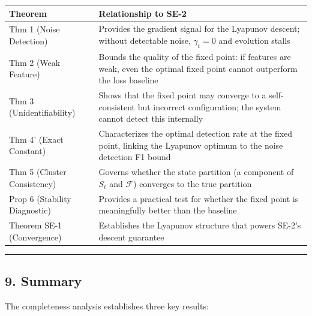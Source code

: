 \documentclass[
  12pt,
]{ctexart}
\begin{document}
\begin{longtable}[]{@{}
  >{\raggedright\arraybackslash}p{}
  >{\raggedright\arraybackslash}p{}@{}}
\toprule\noalign{}
\begin{minipage}[b]{\linewidth}\raggedright
Theorem
\end{minipage} & \begin{minipage}[b]{\linewidth}\raggedright
Relationship to SE-2
\end{minipage} \\
\midrule\noalign{}
\endhead
\bottomrule\noalign{}
\endlastfoot
Thm 1 (Noise Detection) & Provides the gradient signal for the Lyapunov
descent; without detectable noise, \(\gamma_t = 0\) and evolution
stalls \\
Thm 2 (Weak Feature) & Bounds the quality of the fixed point: if
features are weak, even the optimal fixed point cannot outperform the
loss baseline \\
Thm 3 (Unidentifiability) & Shows that the fixed point may converge to a
self-consistent but incorrect configuration; the system cannot detect
this internally \\
Thm 4' (Exact Constant) & Characterizes the optimal detection rate at
the fixed point, linking the Lyapunov optimum to the noise detection F1
bound \\
Thm 5 (Cluster Consistency) & Governs whether the state partition (a
component of \(S_t\) and \(\mathcal{F}\)) converges to the true
partition \\
Prop 6 (Stability Diagnostic) & Provides a practical test for whether
the fixed point is meaningfully better than the baseline \\
Theorem SE-1 (Convergence) & Establishes the Lyapunov structure that
powers SE-2's descent guarantee \\
\end{longtable}

\begin{center}\rule{0.5\linewidth}{0.5pt}\end{center}

\subsection{9. Summary}\label{summary}

The completeness analysis establishes three key results:
\end{document}

